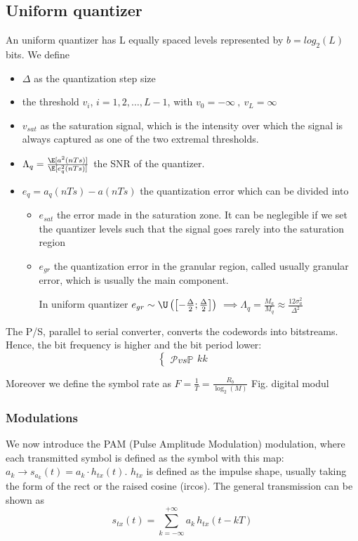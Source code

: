 \subsection{Uniform quantizer}
An uniform quantizer has L equally spaced levels represented by $b = log_2(L)$ bits. We define 
\begin{itemize}
  \item $\Delta$ as the quantization step size
  \item the threshold $v_i$, $i = 1, 2, \dots, L - 1$, with $v_0 = -\infty \ ,\ v_L = \infty$
  \item $v_{sat}$ as the saturation signal, which is the intensity over which the signal is always captured as one of the two extremal thresholds.
  \item $\Lambda_q = \frac{\E[a^2(nTs)]}{\E[e_q^2(nTs)]}$ the SNR of the quantizer.
  \item $e_q = a_q(n Ts) - a(n Ts)$ the quantization error which can be divided into
  \begin{itemize}
    \item $e_{sat}$ the error made in the saturation zone. It can be neglegible if we set the quantizer levels such that the signal goes rarely into the saturation region
    \item $e_{gr}$ the quantization error in the granular region, called usually granular error, which is usually the main component.
    
    In uniform quantizer $e_{gr}\sim \U\left(\left[-\frac{\Delta}{2};\frac{\Delta}{2}\right]\right)$
    $\implies \Lambda_q = \frac{M_a}{M_q} \approx \frac{12 \sigma_a^2 }{\Delta^2}$
  \end{itemize}
\end{itemize}

The P/S, parallel to serial converter, converts the codewords into bitstreams. Hence, the bit frequency is higher and the bit period lower:
\begin{equation}
\begin{cases}
\mathcal{P} vs \mathbb{P}

\end{cases}
kk
\end{equation}

Moreover we define the symbol rate as $F = \frac{1}{T} = \frac{R_b}{\log_2(M)}$
Fig. digital modul

\subsubsection{Modulations}
We now introduce the PAM (Pulse Amplitude Modulation) modulation, where each transmitted symbol is defined as the symbol with this map: $a_k \to s_{a_k} (t) = a_k \cdot h_{tx}(t)$. $h_{tx}$ is defined as the impulse shape, usually taking the form of the rect or the raised cosine (ircos).
The general transmission can be shown as
\begin{equation}
  s_{tx}(t) = \sum\limits_{k=-\infty}^{+\infty} a_k \, h_{tx}(t - kT)
\end{equation}

